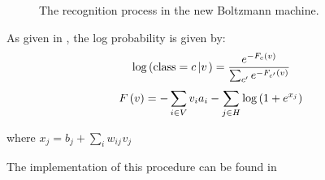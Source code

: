 \begin{figure}[h]
  \caption{The recognition process in the new Boltzmann machine.}
\end{figure}



As given in \cite{hinton2010practical}, the log
probability is  given by:
\[ {\log} \left( \operatorname{class} = c \left| v \right. \right) =
   \frac{e^{- F_c \left( v \right)}}{\sum_{c'} e^{- F_{c'} \left( v
   \right)}} \]
\[ F \left( v \right) = - \sum_{i \in V} v_i a_i - \sum_{j \in H} \log \left(
   1  + e^{x_j} \right) \]


where $x_j = b_j + \sum_i w_{ij_{}} v_j$



The implementation of this procedure can be found in

